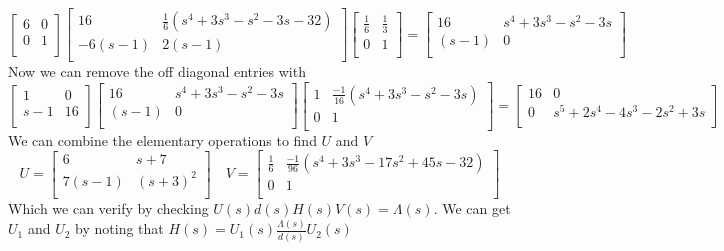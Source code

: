 \documentclass{article}
\begin{document}
\[
\begin{bmatrix}
6 & 0\\
0 & 1\\
\end{bmatrix}
\begin{bmatrix}
16 & \frac{1}{6}(s^4 + 3s^3 -s^2 -3s - 32) \\
-6(s-1) & 2(s-1) \\
\end{bmatrix}
\begin{bmatrix}
\frac{1}{6} & \frac{1}{3} \\
0 & 1 \\
\end{bmatrix}
=
\begin{bmatrix}
16 & s^4 + 3s^3 -s^2 -3s \\
(s-1) & 0 \\
\end{bmatrix}
\]
Now we can remove the off diagonal entries with
$$
\begin{bmatrix}
1 & 0 \\
s-1 & 16\\
\end{bmatrix}
\begin{bmatrix}
16 & s^4 + 3s^3 -s^2 -3s \\
(s-1) & 0 \\
\end{bmatrix}
\begin{bmatrix}
1 & \frac{-1}{16}(s^4 + 3s^3 -s^2 -3s)  \\
0 & 1 \\
\end{bmatrix}
=
\begin{bmatrix}
16 & 0 \\
0 & s^5+2s^4-4s^3-2s^2+3s \\
\end{bmatrix}
$$
We can combine the elementary operations to find $U$ and $V$
\[
U =
\begin{bmatrix}
6 & s+7\\
7(s-1) & (s+3)^2\\
\end{bmatrix}
\quad
V =
\begin{bmatrix}
\frac{1}{6} & \frac{-1}{96}(s^4+3s^3-17s^2+45s-32) \\
0 & 1 \\
\end{bmatrix}
\]
Which we can verify by checking $U(s)d(s)H(s)V(s) = \Lambda(s)$.
We can get $U_1$ and $U_2$ by noting that $H(s) = U_1(s)\frac{\Lambda(s)}{d(s)}U_2(s)$
\end{document}
